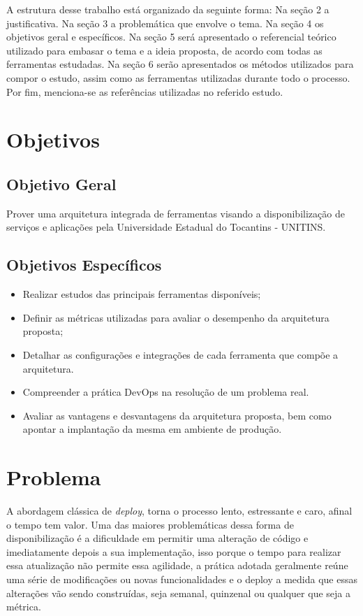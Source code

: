 A estrutura desse trabalho está organizado da seguinte forma: Na seção 2 a justificativa. Na seção 3 a problemática que envolve o tema. Na seção 4 os objetivos geral e específicos. Na seção 5 será apresentado o referencial teórico utilizado para embasar o tema e a ideia proposta, de acordo com todas as ferramentas estudadas. Na seção 6 serão apresentados os métodos utilizados para compor o estudo, assim como as ferramentas utilizadas durante todo o processo. Por fim, menciona-se as referências utilizadas no referido estudo.

\section{Objetivos}\label{cap:c_objetivos}

\subsection{Objetivo Geral }
Prover uma arquitetura integrada de ferramentas visando a disponibilização de serviços e aplicações pela Universidade Estadual do Tocantins - UNITINS.


\subsection{Objetivos Específicos}
\begin{itemize}
	\item Realizar estudos das principais ferramentas disponíveis;
	\item Definir as métricas utilizadas para avaliar o desempenho da arquitetura proposta;
	\item Detalhar as configurações e integrações de cada ferramenta que compõe a arquitetura.
	\item Compreender a prática DevOps na resolução de um problema real.
	\item Avaliar as vantagens e desvantagens da arquitetura proposta, bem como apontar a implantação da mesma em ambiente de produção.
\end{itemize}

\section{Problema}\label{cap:c_problema}

A abordagem clássica de \textit{deploy}, torna o processo lento, estressante e caro, afinal o tempo tem valor. Uma das maiores problemáticas dessa forma de disponibilização é a dificuldade em permitir uma alteração de código e imediatamente depois a sua implementação, isso porque o tempo para realizar essa atualização não permite essa agilidade, a prática adotada geralmente reúne uma série de modificações ou novas funcionalidades e o deploy a medida que essas alterações vão sendo construídas, seja semanal, quinzenal ou qualquer que seja a métrica.

